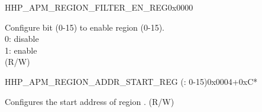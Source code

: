 \begin{register}{H}{HP\_APM\_REGION\_FILTER\_EN\_REG}{0x0000}\label{regdesc:HPAPMREGIONFILTERENREG}
%
%
\regnewline%
\begin{regdesc}\begin{reglist}
\label{fielddesc:HPAPMREGIONFILTEREN}\item [HP\_APM\_REGION\_FILTER\_EN] Configure bit  (0-15) to enable region  (0-15).\\ 
0: disable \\ 
1: enable  \\ (R/W)
\end{reglist}\end{regdesc}
\end{register}


\begin{register}{H}{HP\_APM\_REGION\_ADDR\_START\_REG (: 0-15)}{0x0004+0xC*}\label{regdesc:HPAPMREGION0ADDRSTARTREG}
%
\regnewline%
\begin{regdesc}\begin{reglist}
\label{fielddesc:HPAPMREGION0ADDRSTART}\item [HP\_APM\_REGION\regindex{n}\_ADDR\_START] Configures the start address of region .  (R/W)
\end{reglist}\end{regdesc}
\end{register}

